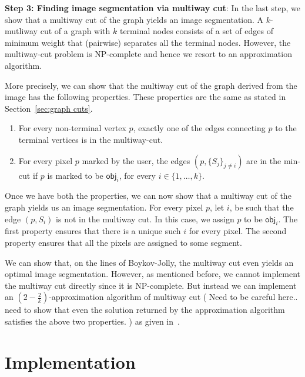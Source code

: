 \documentclass{acm}
\newcommand{\obj}{\mathsf{obj}}
\begin{document}
\noindent \textbf{Step 3: Finding image segmentation via multiway cut}: In the last step, we show that a multiway cut of the graph yields an image segmentation. A $k$-mutliway cut of a graph with $k$ terminal nodes consists of a set of edges of minimum weight that (pairwise) separates all the terminal nodes. However, the multiway-cut problem is NP-complete and hence we resort to an approximation algorithm. 
\par More precisely, we can show that the multiway cut of the graph derived from the image has the following properties. These properties are the same as stated in Section~\ref{sec:graph cuts}. 
\begin{enumerate}

\item For every non-terminal vertex $p$, exactly one of the edges connecting $p$ to the terminal vertices is in the multiway-cut. 
\item For every pixel $p$ marked by the user, the edges $(p,\{S_j\}_{j \neq i})$ are in the min-cut if $p$ is marked to be $\obj_i$, for every $i \in \{1,\ldots,k\}$. 

\end{enumerate}

\noindent Once we have both the properties, we can now show that a multiway cut of the graph yields us an image segmentation. For every pixel $p$, let $i$, be such that the edge $(p,S_i)$ is not in the multiway cut. In this case, we assign $p$ to be $\obj_i$. The first property ensures that there is a unique such $i$ for every pixel. The second property ensures that all the pixels are assigned to some segment.   
\par We can show that, on the lines of Boykov-Jolly, the multiway cut even yields an optimal image segmentation. However, as mentioned before, we cannot implement the multiway cut directly since it is NP-complete. But instead we can implement an $(2-\frac{2}{k})$-approximation algorithm of multiway cut ({\color{red} Need to be careful here.. need to show that even the solution returned by the approximation algorithm satisfies the above two properties. }) as given in~\cite{}. 

\section{Implementation}
\end{document}
